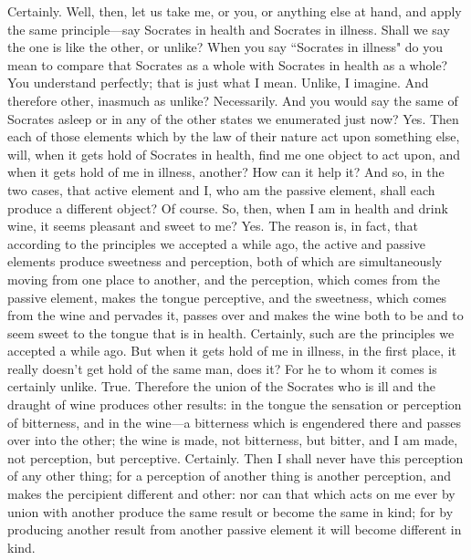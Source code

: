 \documentclass[letterpaper,12pt]{article}
\newcommand{\stephpag}[1]{\marginnote{\small\itshape\fontfamily{ppl}\selectfont #1}}
\begin{document}
\begin{drama}
\theaetetusspeaks
Certainly.
\socratesspeaks
Well, then, let us take me, or you, or anything else at hand, and apply the same principle—say Socrates in health and Socrates in illness. Shall we say the one is like the other, or unlike?
\theaetetusspeaks
When you say ``Socrates in illness" do you mean to compare that Socrates as a whole with Socrates in health as a whole?
\socratesspeaks
You understand perfectly; that is just what I mean.
\theaetetusspeaks
Unlike, I imagine.
\socratesspeaks
And therefore other, inasmuch as unlike?
\theaetetusspeaks
Necessarily.
\socratesspeaks
And you would say the same of Socrates asleep or in any of the other states \stephpag{c} we enumerated just now?
\theaetetusspeaks
Yes.
\socratesspeaks
Then each of those elements which by the law of their nature act upon something else, will, when it gets hold of Socrates in health, find me one object to act upon, and when it gets hold of me in illness, another?
\theaetetusspeaks
How can it help it?
\socratesspeaks
And so, in the two cases, that active element and I, who am the passive element, shall each produce a different object?
\theaetetusspeaks
Of course.
\socratesspeaks
So, then, when I am in health and drink wine, it seems pleasant and sweet to me?
\theaetetusspeaks
Yes.
\socratesspeaks
The reason is, in fact, that according to the principles we accepted a while ago, \stephpag{d} the active and passive elements produce sweetness and perception, both of which are simultaneously moving from one place to another, and the perception, which comes from the passive element, makes the tongue perceptive, and the sweetness, which comes from the wine and pervades it, passes over and makes the wine both to be and to seem sweet to the tongue that is in health.
\theaetetusspeaks
Certainly, such are the principles we accepted a while ago.
\socratesspeaks
But when it gets hold of me in illness, in the first place, it really doesn't get hold of the same man, does it? For he to whom it comes is certainly unlike.
\theaetetusspeaks
True. \stephpag{e}
\socratesspeaks
Therefore the union of the Socrates who is ill and the draught of wine produces other results: in the tongue the sensation or perception of bitterness, and in the wine—a bitterness which is engendered there and passes over into the other; the wine is made, not bitterness, but bitter, and I am made, not perception, but perceptive.
\theaetetusspeaks
Certainly.
\socratesspeaks
Then I shall never have this perception of any other thing; for a perception of another thing is another perception, \stephpag{160 a} and makes the percipient different and other: nor can that which acts on me ever by union with another produce the same result or become the same in kind; for by producing another result from another passive element it will become different in kind.

\end{drama}
\end{document}
